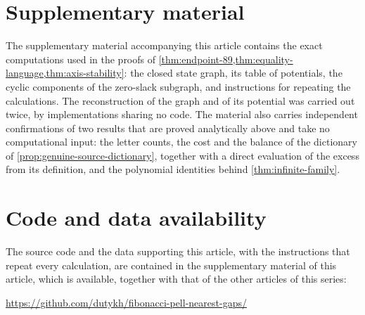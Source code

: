 \documentclass[11pt,reqno]{amsart}
\theoremstyle{definition}
\theoremstyle{definition}
\begin{document}
\section*{Supplementary material}
The supplementary material accompanying this article contains the exact
computations used in the proofs of
\cref{thm:endpoint-89,thm:equality-language,thm:axis-stability}: the closed
state graph, its table of potentials, the cyclic components of the zero-slack
subgraph, and instructions for repeating the calculations. The reconstruction
of the graph and of its potential was carried out twice, by implementations
sharing no code. The material also carries independent confirmations of two
results that are proved analytically above and take no computational input:
the letter counts, the cost and the balance of the dictionary of
\cref{prop:genuine-source-dictionary}, together with a direct evaluation of the
excess from its definition, and the polynomial identities behind
\cref{thm:infinite-family}.

\section*{Code and data availability}
The source code and the data supporting this article, with the instructions
that repeat every calculation, are contained in the supplementary material of
this article, which is available, together with that of the other articles of
this series:

{\centering
\url{https://github.com/dutykh/fibonacci-pell-nearest-gaps/}
\par}



\end{document}
